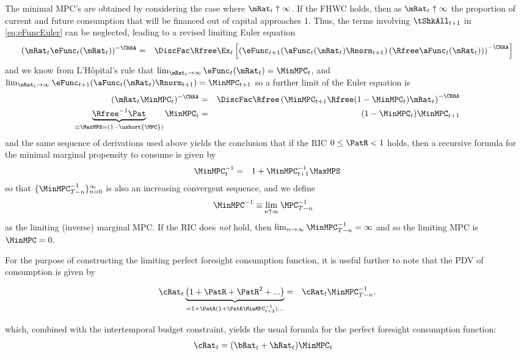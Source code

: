 \documentclass[../BufferStockTheory.tex]{subfiles}
\begin{document}
The minimal MPC's are obtained by considering the case where
$\mRat_{t} \uparrow \infty$.  If the FHWC holds, then as
$\mRat_{t} \uparrow \infty$ the proportion of current and future
consumption that will be financed out of capital approaches 1.  Thus,
the terms involving $\tShkAll_{t+1}$ in \eqref{eq:eFuncEuler} can be
neglected, leading to a revised limiting Euler equation
\begin{eqnarray*}
 ({\mRat_{t}}\eFunc_{t}(\mRat_{t}))^{-\CRRA} & = & \DiscFac \Rfree \Ex_{t}\left[\left(\eFunc_{t+1}(\aFunc_{t}(\mRat_{t})\Rnorm_{t+1})\left({\Rfree \aFunc_{t}(\mRat_{t})}\right)\right)^{-\CRRA}\right]
\end{eqnarray*}
and we know from L'H\^opital's rule that $\lim_{\mRat_{t} \rightarrow \infty} \eFunc_{t}(\mRat_{t}) = \MinMPC_{t}$, and $\lim_{\mRat_{t} \rightarrow \infty} \eFunc_{t+1}(\aFunc_{t}(\mRat_{t})\Rnorm_{t+1}) = \MinMPC_{t+1}$ so a further limit of the Euler equation is\hypertarget{MPCnvrs}{}
\begin{eqnarray*}
  (\mRat_{t}\MinMPC_{t})^{-\CRRA} & = & \DiscFac \Rfree \left(\MinMPC_{t+1} \Rfree (1-\MinMPC_{t})\mRat_{t}\right)^{-\CRRA}
\\ \underbrace{{\Rfree}^{-1}{\Pat}}_{\equiv \MaxMPS = (1-\ushort{\MPC})} \MinMPC_{t} & = & (1-\MinMPC_{t}) \MinMPC_{t+1}
\end{eqnarray*}
and the same sequence of derivations used above yields the conclusion
that if the RIC $0 \leq \PatR < 1$ holds, then a recursive formula for the
minimal marginal propensity to consume is given by
\begin{eqnarray}
 \MinMPC_{t}^{-1} & = & 1+\MinMPC_{t+1}^{-1}\MaxMPS  \label{eq:MinMPCInvApndx}
\end{eqnarray}
so that $\{\MinMPC_{T-n}^{-1}\}_{n=0}^{\infty}$ is also an increasing
convergent sequence, and we define
\begin{align}
\MinMPC^{-1} \equiv &\lim_{n \uparrow \infty} \MPC_{T-n}^{-1}  
\end{align}
as the limiting (inverse) marginal MPC.  If the RIC does \textit{not} hold, then $\lim_{n \rightarrow \infty} \MinMPC_{T-n}^{-1} = \infty$
and so the limiting MPC is $\MinMPC = 0.$

For the purpose of constructing the limiting perfect foresight consumption function, it is useful further to note that
the PDV of consumption is given by\hypertarget{MPCnvrsIsCPDV}{}

\begin{eqnarray*}
  \cRat_{t}\underbrace{\left(1 + \PatR + \PatR^{2} + ... \right)}_{=1+\PatR(1+\PatR\MinMPC_{t+2}^{-1})...}  & = & \cRat_{t}\MinMPC_{T-n}^{-1}.
\end{eqnarray*}

which, combined with the intertemporal budget constraint, yields the usual formula for the perfect foresight consumption function:
\begin{align}
  \cRat_{t} & = (\bRat_{t}+\hRat_{t})\MinMPC_{t}
\end{align}
\end{document}
